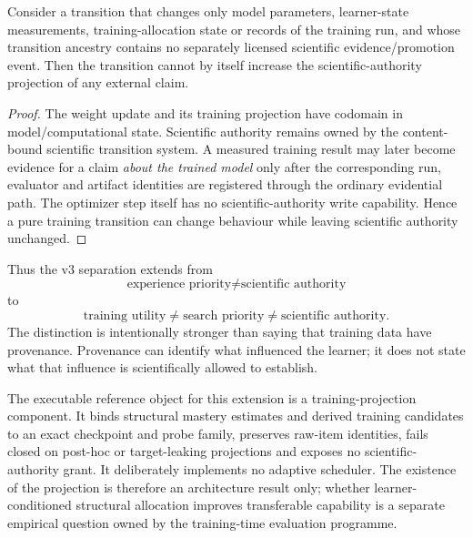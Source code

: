 \begin{proposition}
Consider a transition that changes only model parameters, learner-state measurements, training-allocation state or records of the training run, and whose transition ancestry contains no separately licensed scientific evidence/promotion event.  Then the transition cannot by itself increase the scientific-authority projection of any external claim.
\end{proposition}

\begin{proof}
The weight update and its training projection have codomain in model/computational state.  Scientific authority remains owned by the content-bound scientific transition system.  A measured training result may later become evidence for a claim \emph{about the trained model} only after the corresponding run, evaluator and artifact identities are registered through the ordinary evidential path.  The optimizer step itself has no scientific-authority write capability.  Hence a pure training transition can change behaviour while leaving scientific authority unchanged.
\end{proof}

Thus the v3 separation extends from
\[
\text{experience priority}\neq\text{scientific authority}
\]
to
\[
\boxed{\text{training utility}\neq\text{search priority}\neq\text{scientific authority}}.
\]
The distinction is intentionally stronger than saying that training data have provenance.  Provenance can identify what influenced the learner; it does not state what that influence is scientifically allowed to establish.

The executable reference object for this extension is a training-projection component.  It binds structural mastery estimates and derived training candidates to an exact checkpoint and probe family, preserves raw-item identities, fails closed on post-hoc or target-leaking projections and exposes no scientific-authority grant.  It deliberately implements no adaptive scheduler.  The existence of the projection is therefore an architecture result only; whether learner-conditioned structural allocation improves transferable capability is a separate empirical question owned by the training-time evaluation programme.
